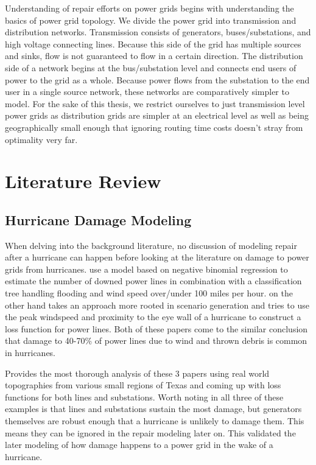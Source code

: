 \documentclass{article}
\begin{document}
	Understanding of repair efforts on power grids begins with understanding the basics of power grid topology. We divide the power grid into transmission and distribution networks. Transmission consists of generators, buses/substations, and high voltage connecting lines. Because this side of the grid has multiple sources and sinks, flow is not guaranteed to flow in a certain direction. The distribution side of a network begins at the bus/substation level and connects end users of power to the grid as a whole. Because power flows from the substation to the end user in a single source network, these networks are comparatively simpler to model. For the sake of this thesis, we restrict ourselves to just transmission level power grids as distribution grids are simpler at an electrical level as well as being geographically small enough that ignoring routing time costs doesn't stray from optimality very far.
	\section{Literature Review}
	\subsection{Hurricane Damage Modeling}
		When delving into the background literature, no discussion of modeling repair after a hurricane can happen before looking at the literature on damage to power grids from hurricanes. \cite{GuikemaEA2010} use a model based on negative binomial regression to estimate the number of downed power lines in combination with a classification tree handling flooding and wind speed over/under 100 miles per hour. \cite{ScherbEA2015} on the other hand takes an approach more rooted in scenario generation and tries to use the peak windspeed and proximity to the eye wall of a hurricane to construct a loss function for power lines. Both of these papers come to the similar conclusion that damage to 40-70\% of power lines due to wind and thrown debris is common in hurricanes.
		
		 \cite{WinklerEA2010} Provides the most thorough analysis of these 3 papers using real world topographies from various small regions of Texas and coming up with loss functions for both lines and substations. Worth noting in all three of these examples is that lines and substations sustain the most damage, but generators themselves are robust enough that a hurricane is unlikely to damage them. This means they can be ignored in the repair modeling later on. This validated the later modeling of how damage happens to a power grid in the wake of a hurricane.
\end{document}
